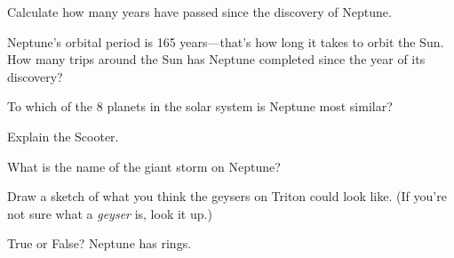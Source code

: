 \documentclass{article}
\numberwithin{equation}{section}
\numberwithin{figure}{section}
\begin{document}
\begin{exercise}
    Calculate how many years have passed since the discovery of Neptune.
\end{exercise}

\begin{exercise}
    Neptune's orbital period is 165 years---that's how long it takes to orbit the Sun. How many trips around the Sun has Neptune completed since the year of its discovery?
\end{exercise}

\begin{exercise}
    To which of the 8 planets in the solar system is Neptune most similar?
\end{exercise}

\begin{exercise}
    Explain the Scooter.
\end{exercise}

\begin{exercise}
    What is the name of the giant storm on Neptune?
\end{exercise}

\begin{exercise}
    Draw a sketch of what you think the geysers on Triton could look like. (If you're not sure what a \textit{geyser} is, look it up.)
\end{exercise}

\begin{exercise}
    True or False? Neptune has rings.
\end{exercise}
\end{document}
